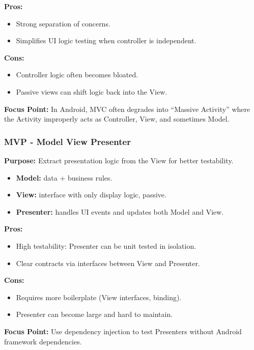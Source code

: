 \documentclass[a4paper,12pt]{article}
\begin{document}
\textbf{Pros:}
\begin{itemize}
  \item Strong separation of concerns.
  \item Simplifies UI logic testing when controller is independent.
\end{itemize}

\textbf{Cons:}
\begin{itemize}
  \item Controller logic often becomes bloated.
  \item Passive views can shift logic back into the View.
\end{itemize}

\textbf{Focus Point:} In Android, MVC often degrades into “Massive Activity” where the Activity improperly acts as Controller, View, and sometimes Model.

\subsubsection{MVP - Model View Presenter}

\textbf{Purpose:} Extract presentation logic from the View for better testability.

\begin{itemize}
  \item \textbf{Model:} data + business rules.
  \item \textbf{View:} interface with only display logic, passive.
  \item \textbf{Presenter:} handles UI events and updates both Model and View.
\end{itemize}

\textbf{Pros:}
\begin{itemize}
  \item High testability: Presenter can be unit tested in isolation.
  \item Clear contracts via interfaces between View and Presenter.
\end{itemize}

\textbf{Cons:}
\begin{itemize}
  \item Requires more boilerplate (View interfaces, binding).
  \item Presenter can become large and hard to maintain.
\end{itemize}

\textbf{Focus Point:} Use dependency injection to test Presenters without Android framework dependencies.
\end{document}
